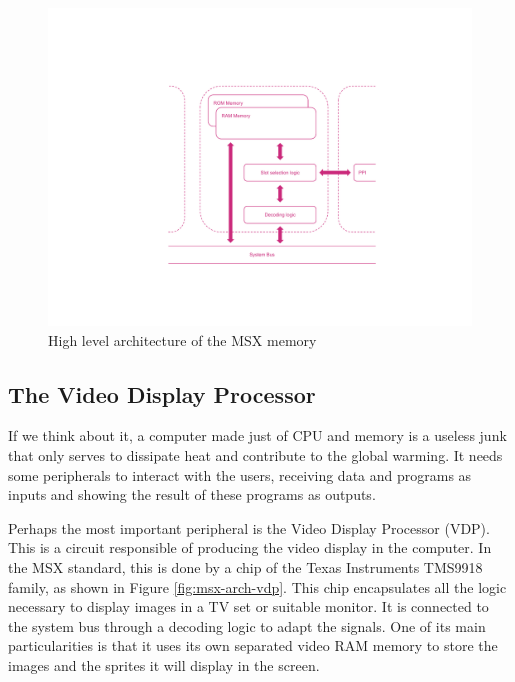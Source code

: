 \begin{figure}
	\centering
	\includegraphics[width=1\linewidth,trim={0cm 100 0 100},clip]{images/figures/msx-arch-memory}
	\caption{High level architecture of the MSX memory}
	\label{fig:msx-arch-memory}
\end{figure}

\subsection{The Video Display Processor}

If we think about it, a computer made just of CPU and memory is a useless junk that only serves to dissipate heat and contribute to the global warming. It needs some peripherals to interact with the users, receiving data and programs as inputs and showing the result of these programs as outputs. 

Perhaps the most important peripheral is the Video Display Processor (VDP). This is a circuit responsible of producing the video display in the computer. In the MSX standard, this is done by a chip of the Texas Instruments TMS9918 family, as shown in Figure \ref{fig:msx-arch-vdp}. This chip encapsulates all the logic necessary to display images in a TV set or suitable monitor. It is connected to the system bus through a decoding logic to adapt the signals. One of its main particularities is that it uses its own separated video RAM memory to store the images and the sprites it will display in the screen. 

